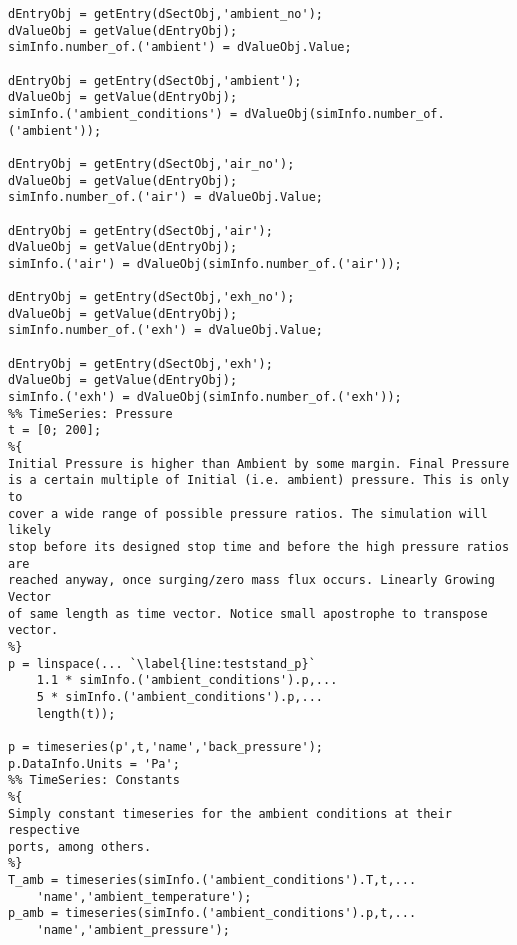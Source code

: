 \begin{lstlisting}
dEntryObj = getEntry(dSectObj,'ambient_no');
dValueObj = getValue(dEntryObj);
simInfo.number_of.('ambient') = dValueObj.Value;

dEntryObj = getEntry(dSectObj,'ambient');
dValueObj = getValue(dEntryObj);
simInfo.('ambient_conditions') = dValueObj(simInfo.number_of.('ambient'));

dEntryObj = getEntry(dSectObj,'air_no');
dValueObj = getValue(dEntryObj);
simInfo.number_of.('air') = dValueObj.Value;

dEntryObj = getEntry(dSectObj,'air');
dValueObj = getValue(dEntryObj);
simInfo.('air') = dValueObj(simInfo.number_of.('air'));

dEntryObj = getEntry(dSectObj,'exh_no');
dValueObj = getValue(dEntryObj);
simInfo.number_of.('exh') = dValueObj.Value;

dEntryObj = getEntry(dSectObj,'exh');
dValueObj = getValue(dEntryObj);
simInfo.('exh') = dValueObj(simInfo.number_of.('exh'));
%% TimeSeries: Pressure
t = [0; 200];
%{
Initial Pressure is higher than Ambient by some margin. Final Pressure
is a certain multiple of Initial (i.e. ambient) pressure. This is only to
cover a wide range of possible pressure ratios. The simulation will likely
stop before its designed stop time and before the high pressure ratios are
reached anyway, once surging/zero mass flux occurs. Linearly Growing Vector
of same length as time vector. Notice small apostrophe to transpose vector.
%}
p = linspace(... `\label{line:teststand_p}`
    1.1 * simInfo.('ambient_conditions').p,...
    5 * simInfo.('ambient_conditions').p,...
    length(t));

p = timeseries(p',t,'name','back_pressure');
p.DataInfo.Units = 'Pa';
%% TimeSeries: Constants
%{
Simply constant timeseries for the ambient conditions at their respective
ports, among others.
%}
T_amb = timeseries(simInfo.('ambient_conditions').T,t,...
    'name','ambient_temperature');
p_amb = timeseries(simInfo.('ambient_conditions').p,t,...
    'name','ambient_pressure');


\end{lstlisting}
